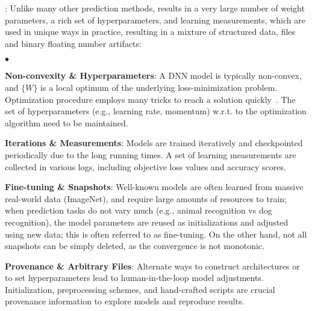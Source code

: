 \documentclass[conference]{IEEEtran}
\begin{document}
: 
Unlike many other prediction methods, \dnn\modeling results in a very large number of weight parameters, a rich set of hyperparameters, and learning measurements, which are used in unique ways in practice, resulting in a mixture of structured data, files and binary floating number artifacts: 
\begin{list}{$\bullet$}{\leftmargin 0.10in \topsep -2pt} %
\item \textbf{Non-convexity \& Hyperparameters}: A DNN model is typically non-convex, and $\{W\}$ is a local optimum of the underlying loss-minimization problem. Optimization procedure employs many tricks to reach a solution quickly~\cite{sgdtrick2012dnntrickbook}. The set of hyperparameters (e.g., learning rate, momentum) w.r.t. to the optimization algorithm need to be maintained. 
\item \textbf{Iterations \& Measurements}: Models are trained iteratively and checkpointed periodically due to the long running times.  A set of learning measurements are collected in various logs, including objective loss values and accuracy scores. %
\item \textbf{Fine-tuning \& Snapshots}: Well-known models are often learned from massive real-world data (ImageNet), and require large amounts of resources to train; when prediction tasks do not vary much (e.g., animal recognition vs dog recognition), the model parameters are reused as initializations and adjusted using new data; this is often referred to as fine-tuning. On the other hand, not all snapshots can be simply deleted, as the convergence is not monotonic.
\item \textbf{Provenance \& Arbitrary Files}: Alternate ways to construct architectures or to set hyperparameters lead to human-in-the-loop model adjustments. Initialization, preprocessing schemes, and hand-crafted scripts are crucial provenance information to explore models and reproduce results.
\end{list}
\end{document}
